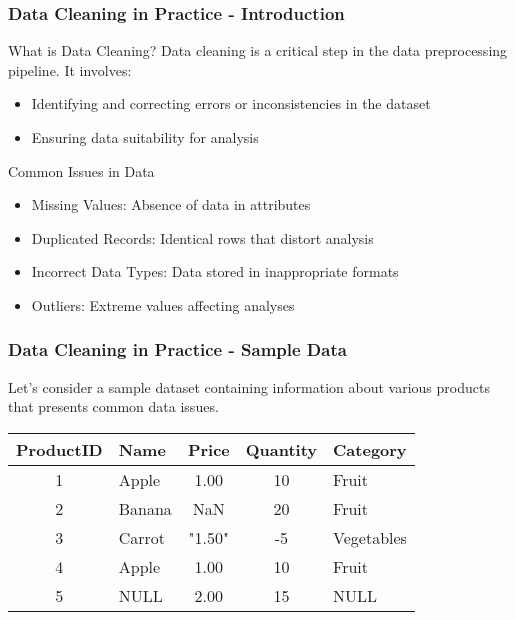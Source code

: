 \documentclass[aspectratio=169]{beamer}
\begin{document}
\begin{frame}[fragile]
    \frametitle{Data Cleaning in Practice - Introduction}
    \begin{block}{What is Data Cleaning?}
        Data cleaning is a critical step in the data preprocessing pipeline. It involves:
        \begin{itemize}
            \item Identifying and correcting errors or inconsistencies in the dataset 
            \item Ensuring data suitability for analysis
        \end{itemize}
    \end{block}
    
    \begin{block}{Common Issues in Data}
        \begin{itemize}
            \item Missing Values: Absence of data in attributes
            \item Duplicated Records: Identical rows that distort analysis
            \item Incorrect Data Types: Data stored in inappropriate formats 
            \item Outliers: Extreme values affecting analyses 
        \end{itemize}
    \end{block}
\end{frame}

\begin{frame}[fragile]
    \frametitle{Data Cleaning in Practice - Sample Data}
    Let's consider a sample dataset containing information about various products that presents common data issues.

    \begin{center}
    \begin{tabular}{|c|l|c|c|l|}
        \hline
        ProductID & Name & Price & Quantity & Category \\
        \hline
        1 & Apple & 1.00 & 10 & Fruit \\
        2 & Banana & NaN & 20 & Fruit \\
        3 & Carrot & "1.50" & -5 & Vegetables \\
        4 & Apple & 1.00 & 10 & Fruit \\
        5 & NULL & 2.00 & 15 & NULL \\
        \hline
    \end{tabular}
    \end{center}
\end{frame}
\end{document}
